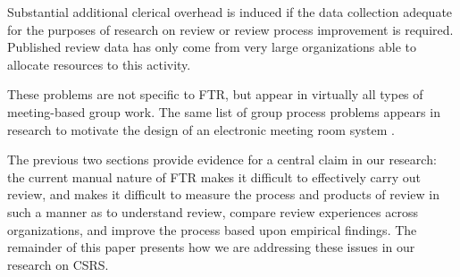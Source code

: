 \begin{itemizenoindent}
  Substantial additional clerical overhead is induced if the data
  collection adequate for the purposes of research on review or review
  process improvement is required.  Published review data has only come
  from very large organizations able to allocate resources to this activity.

\end{itemizenoindent}

These problems are not specific to FTR, but appear in virtually all
types of meeting-based group work.  The same list of group process
problems appears in research to motivate the design of an electronic
meeting room system \cite{Nunamaker91}.  

The previous two sections provide evidence for a central claim in our
research: the current manual nature of FTR makes it difficult to
effectively carry out review, and makes it difficult to measure the
process and products of review in such a manner as to understand
review, compare review experiences across organizations, and improve
the process based upon empirical findings. The remainder of this paper
presents how we are addressing these issues in our research on CSRS.





